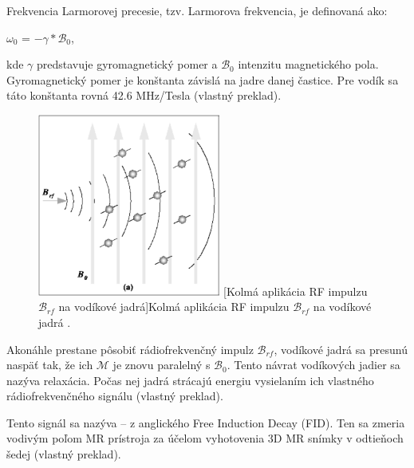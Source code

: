 \clearpage

Frekvencia Larmorovej precesie, tzv. Larmorova frekvencia, je definovaná ako:
\begin {center}
$\omega_{0}$ = $-\gamma * \mathcal{B}_{0}$,
\end {center}

kde $\gamma$ predstavuje gyromagnetický pomer a $\mathcal{B}_{0}$ intenzitu magnetického pola.
Gyromagnetický pomer je konštanta závislá na jadre danej častice. \newline Pre vodík sa táto konštanta rovná 42.6 MHz/Tesla \cite{basic_principles_of_mri} (vlastný preklad).

\begin {figure}[H]
        \centering
        \includegraphics[height=6cm]{media/hydrogen/hydrogen_reacting_to_rf.png}
        \captionsetup{justification=centering}
        [Kolmá aplikácia RF impulzu $\mathcal{B}_{rf}$ na vodíkové jadrá]{Kolmá aplikácia RF impulzu $\mathcal{B}_{rf}$ na vodíkové jadrá \cite{basic_principles_of_mri}.}
\end {figure}

Akonáhle prestane pôsobiť rádiofrekvenčný impulz $\mathcal{B}_{rf}$, vodíkové jadrá sa presunú naspäť tak, že ich $\mathcal{M}$ je znovu paralelný s $\mathcal{B}_{0}$. Tento návrat vodíkových jadier sa nazýva relaxácia. Počas nej jadrá strácajú energiu vysielaním ich vlastného rádiofrekvenčného signálu  \cite{basic_principles_of_mri} (vlastný preklad).

Tento signál sa nazýva  -- z anglického Free Induction Decay (FID). Ten sa zmeria vodivým poľom MR prístroja za účelom vyhotovenia 3D MR snímky v odtieňoch šedej \cite{basic_principles_of_mri} (vlastný preklad).

